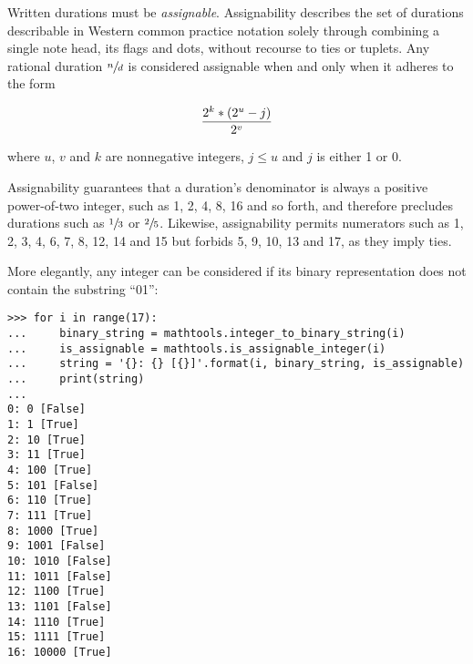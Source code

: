 Written durations must be \emph{assignable}. Assignability describes the set of
durations describable in Western common practice notation solely through
combining a single note head, its flags and dots, without recourse to ties or
tuplets. Any rational duration $\sfrac{n}{d}$ is considered assignable when and
only when it adheres to the form

\begin{equation}
{ 2^k * (2^u - j) \over 2^v }
\end{equation}

\noindent where $u$, $v$ and $k$ are nonnegative integers, $j \leq
u$ and $j$ is either 1 or 0.

Assignability guarantees that a duration's denominator is always a positive
power-of-two integer, such as 1, 2, 4, 8, 16 and so forth, and therefore
precludes durations such as $\sfrac{1}{3}$ or $\sfrac{2}{5}$. Likewise,
assignability permits numerators such as 1, 2, 3, 4, 6, 7, 8, 12, 14 and 15 but
forbids 5, 9, 10, 13 and 17, as they imply ties.

More elegantly, any integer can be considered if its binary representation does
not contain the substring \enquote{01}:

\begin{comment}
<abjad>
for i in range(17):
    binary_string = mathtools.integer_to_binary_string(i)
    is_assignable = mathtools.is_assignable_integer(i)
    string = '{}: {} [{}]'.format(i, binary_string, is_assignable)
    print(string)

</abjad>
\end{comment}

\begin{abjadbookoutput}
\begin{singlespacing}
\vspace{-0.5\baselineskip}
\begin{lstlisting}
>>> for i in range(17):
...     binary_string = mathtools.integer_to_binary_string(i)
...     is_assignable = mathtools.is_assignable_integer(i)
...     string = '{}: {} [{}]'.format(i, binary_string, is_assignable)
...     print(string)
...
0: 0 [False]
1: 1 [True]
2: 10 [True]
3: 11 [True]
4: 100 [True]
5: 101 [False]
6: 110 [True]
7: 111 [True]
8: 1000 [True]
9: 1001 [False]
10: 1010 [False]
11: 1011 [False]
12: 1100 [True]
13: 1101 [False]
14: 1110 [True]
15: 1111 [True]
16: 10000 [True]
\end{lstlisting}
\end{singlespacing}
\end{abjadbookoutput}

